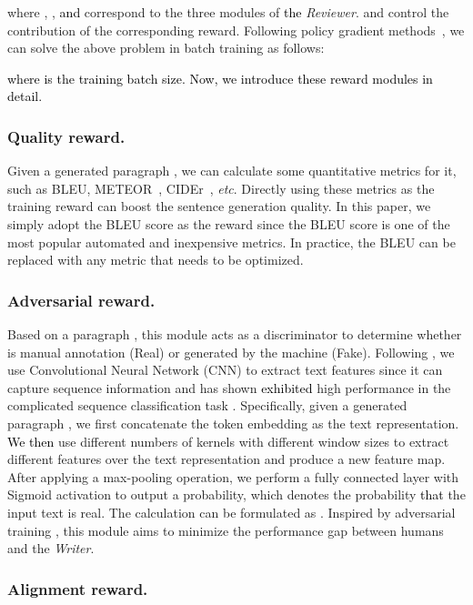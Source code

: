 \documentclass[letterpaper]{article}
\def\xgh{\textcolor{black}}
\def\hmg{\textcolor{black}}
\begin{document}
where , , \hmg{and}   correspond to the three modules of \hmg{the} \textit{Reviewer}.  and  control the contribution of the corresponding reward. Following policy gradient methods~\cite{Williams92simplestatistical,Schulman2017ProximalPO}, we can solve the above problem in batch training as follows:

\xgh{where  is the training batch size. Now, we introduce these reward modules in detail.}

\subsubsection{Quality reward.}
Given a generated paragraph , we can calculate some quantitative metrics for it, such as BLEU\cite{10.3115/1073083.1073135}, METEOR~\cite{Denkowski2014MeteorUL}, CIDEr~\cite{Vedantam2015CIDErCI}, \textit{etc}. Directly using these metrics as the training reward can boost the sentence generation quality.
In this paper, we simply adopt the BLEU score  as the reward since the BLEU score is one of the most popular automated and inexpensive metrics. In practice, the BLEU can be replaced with any metric that needs to be optimized.

\subsubsection{Adversarial reward.}
Based on a paragraph , this module acts as a discriminator to determine whether  is manual annotation (Real) or generated by the machine (Fake).
Following \cite{Yu2017SeqGANSG}, we use Convolutional Neural Network (CNN) to extract text features since it can capture sequence information and has shown \hmg{exhibited} high performance in the complicated sequence classification task \cite{Zhang2015TextUF}. 
Specifically, given a generated paragraph , we first concatenate the token embedding as the text representation. 
\hmg{We then }use different numbers of kernels with different window sizes to extract different features over the text representation and produce a new feature map.
After applying a max-pooling operation, we perform a fully connected layer with Sigmoid activation to output a probability, which denotes the probability \hmg{that} the input text is real. The calculation can be formulated as .
Inspired by adversarial training \cite{cao18a}, this module aims to minimize the performance gap between humans and the \textit{Writer}.

\subsubsection{Alignment reward.}
\end{document}
